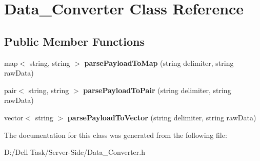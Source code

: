 \hypertarget{class_data___converter}{}\section{Data\+\_\+\+Converter Class Reference}
\label{class_data___converter}
\subsection*{Public Member Functions}
\begin{DoxyCompactItemize}
\item 
\mbox{\label{class_data___converter_a45f8ad3ef4b0ad7de5df3f9f7cf1f0d0}} 
map$<$ string, string $>$ {\bfseries parse\+Payload\+To\+Map} (string delimiter, string raw\+Data)
\item 
\mbox{\label{class_data___converter_a48f47d299febcb20426ea94c771bcce5}} 
pair$<$ string, string $>$ {\bfseries parse\+Payload\+To\+Pair} (string delimiter, string raw\+Data)
\item 
\mbox{\label{class_data___converter_a1133a82759d37dcf0f1e0536e979ed60}} 
vector$<$ string $>$ {\bfseries parse\+Payload\+To\+Vector} (string delimiter, string raw\+Data)
\end{DoxyCompactItemize}


The documentation for this class was generated from the following file\+:\begin{DoxyCompactItemize}
\item 
D\+:/\+Dell Task/\+Server-\/\+Side/Data\+\_\+\+Converter.\+h\end{DoxyCompactItemize}
